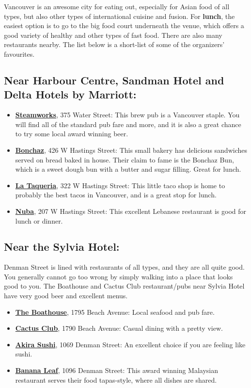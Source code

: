 \documentclass[letterpaper,12pt]{article}
\begin{document}
Vancouver is an awesome city for eating out, especially for Asian food of all types, but also other types of international cuisine and fusion. For \textbf{lunch}, the easiest option is to go to the big food court underneath the venue, which offers a good variety of healthy and other types of fast food. There are also many restaurants nearby. The list below is a short-list of some of the organizers’ favourites.

\subsection*{Near Harbour Centre, Sandman Hotel and Delta Hotels by Marriott:}
\begin{itemize}
\setlength{\itemsep}{0pt}
\item \href{http://www.steamworks.com}{\textbf{Steamworks}}, 375 Water Street: This brew pub is a Vancouver staple. You will find all of the standard pub fare and more, and it is also a great chance to try some local award winning beer.
\item \href{http://www.bonchaz.ca}{\textbf{Bonchaz}}, 426 W Hastings Street: This small bakery has delicious sandwiches served on bread baked in house. Their claim to fame is the Bonchaz Bun, which is a sweet dough bun with a butter and sugar filling. Great for lunch.
\item \href{http://www.lataqueria.com}{\textbf{La Taqueria}}, 322 W Hastings Street: This little taco shop is home to probably the best tacos in Vancouver, and is a great stop for lunch.
\item \href{http://www.nuba.ca}{\textbf{Nuba}}, 207 W Hastings Street: This excellent Lebanese restaurant is good for lunch or dinner.
\end{itemize}

\subsection*{Near the Sylvia Hotel:}

Denman Street is lined with restaurants of all types, and they are all quite good. You generally cannot go too wrong by simply walking into a place that looks good to you. The Boathouse and Cactus Club restaurant/pubs near Sylvia Hotel have very good beer and excellent menus. 

\begin{itemize}
\setlength{\itemsep}{0pt}
\item \href{http://boathouserestaurants.ca/locations/#ENGLISH%20BAY}{\textbf{The Boathouse}}, 1795 Beach Avenue: Local seafood and pub fare.
\item \href{https://www.cactusclubcafe.com/location/english-bay/}{\textbf{Cactus Club}}, 1790 Beach Avenue: Casual dining with a pretty view.
\item \href{http://www.akirasushi.ca}{\textbf{Akira Sushi}}, 1069 Denman Street: An excellent choice if you are feeling like sushi.
\item \href{http://www.bananaleaf-vancouver.com}{\textbf{Banana Leaf}}, 1096 Denman Street: This award winning Malaysian restaurant serves their food tapas-style, where all dishes are shared.
\end{itemize}
\end{document}
